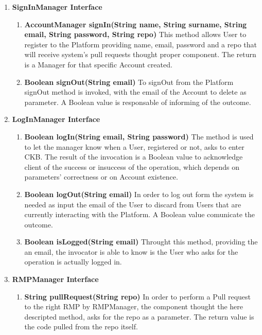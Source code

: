 \begin{enumerate}
    \item \textbf{SignInManager Interface} 
            \begin{enumerate}[label=$\bullet$]
                \item \textbf{AccountManager signIn(String name, String surname, String email, String password, String repo)} This method allows User to register to the Platform providing name, email, password and a repo that will receive system's pull requests thought proper component. The return is a Manager for that specific Account created.
                \item \textbf{Boolean signOut(String email)} To signOut from the Platform signOut method is invoked, with the email of the Account to delete as parameter. A Boolean value is responsable of informing of the outcome.
            \end{enumerate}
    \item \textbf{LogInManager Interface}
        \begin{enumerate}[label=$\bullet$]
            \item \textbf{Boolean logIn(String email, String password)} The method is used to let the manager know when a User, registered or not, asks to enter CKB. The result of the invocation is a Boolean value to acknowledge client of the success or insuccess of the operation, which depends on parameters' correctness or on Account existence.
            \item \textbf{Boolean logOut(String email)} In order to log out form the system is needed as input the email of the User to discard from Users that are currently interacting with the Platform. A Boolean value comunicate the outcome.
            \item \textbf{Boolean isLogged(String email)} Throught this method, providing the an email, the invocator is able to know is the User who asks for the operation is actually logged in.
        \end{enumerate}
    \item \textbf{RMPManager Interface}
        \begin{enumerate}[label=$\bullet$]
            \item \textbf{String pullRequest(String repo)} In order to perform a Pull request to the right RMP by RMPManager, the component thought the here descripted method, asks for the repo as a parameter. The return value is the code pulled from the repo itself.
        \end{enumerate} 

\end{enumerate}
